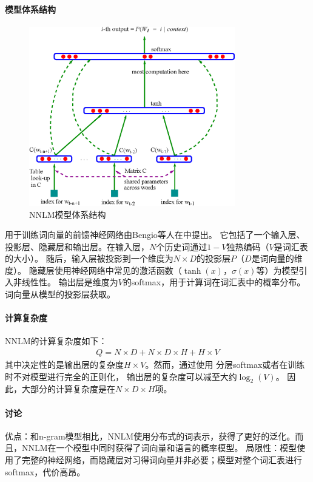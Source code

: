 \paragraph{模型体系结构}
\begin{figure}
  \includegraphics[width=0.8\textwidth]{figures/NNLM-arch.eps}
  \centering
  \caption{NNLM模型体系结构\cite{Bengio2006}}
  \label{fig:NNLM-arch}
\end{figure}

用于训练词向量的前馈神经网络由Bengio等人在\cite{DBLP:journals/jmlr/BengioDVJ03}中提出。
它包括了一个输入层、投影层、隐藏层和输出层。在输入层，$N$个历史词通过$1-V$独热编码（$V$是词汇表的大小）。
随后，输入层被投影到一个维度为$N \times D$的投影层$P$（$D$是词向量的维度）。
隐藏层使用神经网络中常见的激活函数（$\tanh(x)$，$\sigma(x)$等）为模型引入非线性性。
输出层是维度为$V$的softmax，用于计算词在词汇表中的概率分布。词向量从模型的投影层获取。

\paragraph{计算复杂度}
NNLM的计算复杂度如下：
\begin{align}
  Q = N \times D + N \times D \times H + H \times V
  \label{eqn:nnlm-complexity}
\end{align}
其中决定性的是输出层的复杂度$H \times V$。然而，通过使用
分层softmax或者在训练时不对模型进行完全的正则化， 输出层的复杂度可以减至大约$\log_2(V)$。
因此，大部分的计算复杂度是在$N \times D \times H$项。

\paragraph{讨论}
优点：和n-gram模型相比，NNLM使用分布式的词表示，获得了更好的泛化。而且，NNLM在一个模型中同时获得了词向量和语言的概率模型。
局限性：模型使用了完整的神经网络，而隐藏层对习得词向量并非必要；模型对整个词汇表进行softmax，代价高昂。

